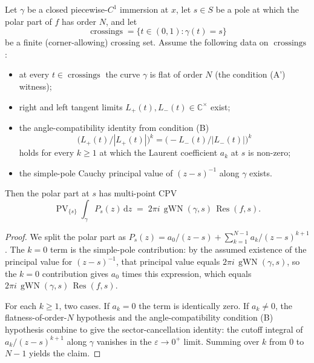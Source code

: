 \begin{theorem}
  \label{thm:cpv-polar-multicrossed-condB}
  \leanok
  Let $\gamma$ be a closed piecewise-$C^{1}$ immersion at $x$, let
  $s \in S$ be a pole at which the polar part of $f$ has order $N$,
  and let
  \[
    \operatorname{crossings} = \{ t \in (0,1) : \gamma(t) = s \}
  \]
  be a finite (corner-allowing) crossing set. Assume the following
  data on $\operatorname{crossings}$:
  \begin{itemize}
    \item at every $t \in \operatorname{crossings}$ the curve
      $\gamma$ is flat of order $N$ (the condition (A') witness);
    \item right and left tangent limits $L_+(t), L_-(t) \in
      \mathbb{C}^{\times}$ exist;
    \item the angle-compatibility identity from condition (B)
      \[
        \bigl(L_+(t) / |L_+(t)|\bigr)^{k}
        = \bigl(-L_-(t) / |L_-(t)|\bigr)^{k}
      \]
      holds for every $k \ge 1$ at which the Laurent coefficient
      $a_k$ at $s$ is non-zero;
    \item the simple-pole Cauchy principal value of $(z - s)^{-1}$
      along $\gamma$ exists.
  \end{itemize}
  Then the polar part at $s$ has multi-point CPV
  \[
    \operatorname{PV}_{\{s\}}\!\!\int_\gamma P_s(z)\,\mathrm{d}z
    \;=\; 2 \pi i \, \operatorname{gWN}(\gamma, s) \,
      \operatorname{Res}(f, s).
  \]
\end{theorem}

\begin{proof}
  \leanok
  We split the polar part as
  $P_s(z) = a_0/(z-s) + \sum_{k=1}^{N-1} a_k/(z-s)^{k+1}$. The
  $k = 0$ term is the simple-pole contribution: by the assumed
  existence of the principal value for $(z-s)^{-1}$, that principal
  value equals $2\pi i \, \operatorname{gWN}(\gamma, s)$, so the
  $k=0$ contribution gives $a_0$ times this expression, which equals
  $2\pi i \, \operatorname{gWN}(\gamma, s) \, \operatorname{Res}(f, s)$.

  For each $k \ge 1$, two cases. If $a_k = 0$ the term is
  identically zero. If $a_k \ne 0$, the flatness-of-order-$N$
  hypothesis and the angle-compatibility condition (B) hypothesis
  combine to give the sector-cancellation identity: the cutoff
  integral of $a_k/(z-s)^{k+1}$ along $\gamma$ vanishes in the
  $\varepsilon \to 0^+$ limit. Summing over $k$ from $0$ to $N-1$
  yields the claim.
\end{proof}

